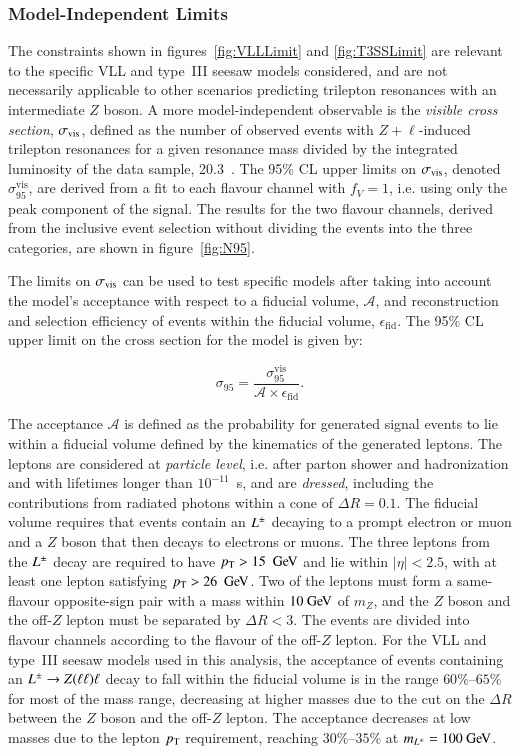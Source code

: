 \subsubsection{Model-Independent Limits}

The constraints shown in figures~\ref{fig:VLLLimit} and \ref{fig:T3SSLimit} are relevant to the specific VLL and type~III seesaw models considered, and are not necessarily applicable to other scenarios predicting trilepton resonances with an intermediate $Z$ boson. A more model-independent observable is the \emph{visible cross section}, $\sigma_{\mathrm{vis}}$, defined as the number of observed events with $Z+\ell$-induced trilepton resonances for a given resonance mass divided by the integrated luminosity of the data sample, 20.3~\ifb. The 95\% CL upper limits on $\sigma_{\mathrm{vis}}$, denoted $\sigma_{95}^{\mathrm{vis}}$, are derived from a fit to each flavour channel with $f_V=1$, i.e. using only the peak component of the signal. The results for the two flavour channels, derived from the inclusive event selection without dividing the events into the three categories, are shown in figure~\ref{fig:N95}.

The limits on $\sigma_{\mathrm{vis}}$ can be used to test specific models after taking into account the model's acceptance with respect to a fiducial volume, $\mathcal{A}$, and reconstruction and selection efficiency of events within the fiducial volume, $\epsilon_{\mathrm{fid}}$. The 95\% CL upper limit on the cross section for the model is given by:

\begin{equation}\label{eqn:sigma95}
	\sigma_{95} = \frac{\sigma_{95}^{\mathrm{vis}}}{\mathcal{A}\times \epsilon_{\mathrm{fid}}}.
\end{equation}

The acceptance $\mathcal{A}$ is defined as the probability for generated signal events to lie within a fiducial volume defined by the kinematics of the generated leptons. The leptons are considered at \emph{particle level}, i.e. after parton shower and hadronization and with lifetimes longer than $10^{-11}$~s, and are \emph{dressed}, including the contributions from radiated photons within a cone of $\Delta R=0.1$. The fiducial volume requires that events contain an $L^{\pm}$ decaying to a prompt electron or muon and a $Z$ boson that then decays to electrons or muons. The three leptons from the $L^{\pm}$ decay are required to have $\pt>15~\GeV$ and lie within $|\eta|<2.5$, with at least one lepton satisfying $\pt>26~\GeV$. Two of the leptons must form a same-flavour opposite-sign pair with a mass within $10 \GeV$ of $m_Z$, and the $Z$ boson and the off-$Z$ lepton must be separated by $\Delta R < 3$.  The events are divided into flavour channels according to the flavour of the off-$Z$ lepton. For the VLL and type~III seesaw models used in this analysis, the acceptance of events containing an $L^{\pm}\rightarrow Z(\ell\ell)\ell$ decay to fall within the fiducial volume is in the range $60\%$--$65\%$ for most of the mass range, decreasing at higher masses due to the cut on the $\Delta R$ between the $Z$ boson and the off-$Z$ lepton. The acceptance decreases at low masses due to the lepton $p_{\text{T}}$ requirement, reaching $30\%$--$35\%$ at $m_{\lpm}=100 \GeV$.

